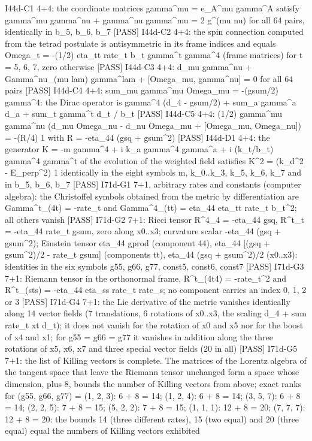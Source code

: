 \documentclass[
  10pt,
]{article}
\newenvironment{Shaded}{}{}
\newcommand{\NormalTok}[1]{#1}
\begin{document}
\begin{Shaded}
\begin{Highlighting}[]
\NormalTok{[PASS] I44d{-}C1  4+4: the coordinate matrices gamma\^{}mu = e\_A\^{}mu gamma\^{}A satisfy gamma\^{}mu gamma\^{}nu + gamma\^{}nu gamma\^{}mu = 2 g\^{}(mu nu) for all 64 pairs, identically in b\_5, b\_6, b\_7}
\NormalTok{[PASS] I44d{-}C2  4+4: the spin connection computed from the tetrad postulate is antisymmetric in its frame indices and equals Omega\_t = {-}(1/2) eta\_tt rate\_t b\_t gamma\^{}t gamma\^{}4 (frame matrices) for t = 5, 6, 7, zero otherwise}
\NormalTok{[PASS] I44d{-}C3  4+4: d\_mu gamma\^{}nu + Gamma\^{}nu\_(mu lam) gamma\^{}lam + [Omega\_mu, gamma\^{}nu] = 0 for all 64 pairs}
\NormalTok{[PASS] I44d{-}C4  4+4: sum\_mu gamma\^{}mu Omega\_mu = {-}(gsum/2) gamma\^{}4: the Dirac operator is gamma\^{}4 (d\_4 {-} gsum/2) + sum\_a gamma\^{}a d\_a + sum\_t gamma\^{}t d\_t / b\_t}
\NormalTok{[PASS] I44d{-}C5  4+4: (1/2) gamma\^{}mu gamma\^{}nu (d\_mu Omega\_nu {-} d\_nu Omega\_mu + [Omega\_mu, Omega\_nu]) = {-}(R/4) 1 with R = {-}eta\_44 (gsq + gsum\^{}2)}
\NormalTok{[PASS] I44d{-}D1  4+4: the generator K = {-}m gamma\^{}4 + i k\_a gamma\^{}4 gamma\^{}a + i (k\_t/b\_t) gamma\^{}4 gamma\^{}t of the evolution of the weighted field satisfies K\^{}2 = (k\_d\^{}2 {-} E\_perp\^{}2) 1 identically in the eight symbols m, k\_0..k\_3, k\_5, k\_6, k\_7 and in b\_5, b\_6, b\_7}
\NormalTok{[PASS] I71d{-}G1  7+1, arbitrary rates and constants (computer algebra): the Christoffel symbols obtained from the metric by differentiation are Gamma\^{}t\_(4t) = {-}rate\_t and Gamma\^{}4\_(tt) = eta\_44 eta\_tt rate\_t b\_t\^{}2; all others vanish}
\NormalTok{[PASS] I71d{-}G2  7+1: Ricci tensor R\^{}4\_4 = {-}eta\_44 gsq, R\^{}t\_t = {-}eta\_44 rate\_t gsum, zero along x0..x3; curvature scalar {-}eta\_44 (gsq + gsum\^{}2); Einstein tensor eta\_44 gprod (component 44), eta\_44 [(gsq + gsum\^{}2)/2 {-} rate\_t gsum] (components tt), eta\_44 (gsq + gsum\^{}2)/2 (x0..x3): identities in the six symbols g55, g66, g77, const5, const6, const7}
\NormalTok{[PASS] I71d{-}G3  7+1: Riemann tensor in the orthonormal frame, R\^{}t\_(4t4) = {-}rate\_t\^{}2 and R\^{}t\_(sts) = {-}eta\_44 eta\_ss rate\_t rate\_s; no component carries an index 0, 1, 2 or 3}
\NormalTok{[PASS] I71d{-}G4  7+1: the Lie derivative of the metric vanishes identically along 14 vector fields (7 translations, 6 rotations of x0..x3, the scaling d\_4 + sum rate\_t xt d\_t); it does not vanish for the rotation of x0 and x5 nor for the boost of x4 and x1; for g55 = g66 = g77 it vanishes in addition along the three rotations of x5, x6, x7 and three special vector fields (20 in all)}
\NormalTok{[PASS] I71d{-}G5  7+1: the list of Killing vectors is complete. The matrices of the Lorentz algebra of the tangent space that leave the Riemann tensor unchanged form a space whose dimension, plus 8, bounds the number of Killing vectors from above; exact ranks for (g55, g66, g77) = (1, 2, 3): 6 + 8 = 14; (1, 2, 4): 6 + 8 = 14; (3, 5, 7): 6 + 8 = 14; (2, 2, 5): 7 + 8 = 15; (5, 2, 2): 7 + 8 = 15; (1, 1, 1): 12 + 8 = 20; (7, 7, 7): 12 + 8 = 20: the bounds 14 (three different rates), 15 (two equal) and 20 (three equal) equal the numbers of Killing vectors exhibited}

\end{Highlighting}
\end{Shaded}
\end{document}
